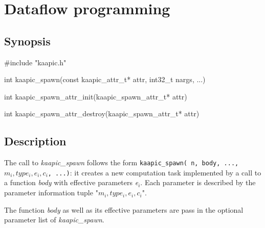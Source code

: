 \documentclass[a4paper, 11pt]{article}
\makeatletter
\newenvironment{apisection}[2][noshortnameprovided]{%
  \newpage
  \section{#2}
  \label{api@#1}
  \newcommand{\api@newpart}[4][noshortpartnameprovided]{%
    \newenvironment{##1}{%
      \subsection{##2}%
      \label{api@#1@##1}%
      ##3%
    }{##4}%
  }%
  \api@newpart[synopsis]{Synopsis}{}{}%
  \api@newpart[call]{Call}{}{}%
  \api@newpart[desc]{Description}{}{}%
  \api@newpart[params]{Parameters}{%
    \let\api@indesc\@empty
    \newcommand{\param}[1]{%
      \def\api@indesc{yes}%
      \begin{description}%
        \renewcommand{\param}[1]{\item[########1]}%
      \item[####1]
      }%
      \newenvironment{parameters}{%
        \begin{description}%
          \renewcommand{\param}[1]{\item[########1]}%
        }{%
        \end{description}%
      }
    }{%
      \ifx\api@indesc\@empty\relax\else%
    \end{description}%
    \fi%
  }%
  \api@newpart[ret]{Return value}{%
    \newcommand{\otherret}{\par\medskip\noindent}%
  }{}%
  \api@newpart[example]{Example}{}{}%
}{}
\newcommand{\fn}[1]{\textit{#1}}%
\newcommand{\kaapi}{\textsc{X-Kaapi}\xspace}
\makeatother
\begin{document}
\begin{apisection}[dataflow]{Dataflow programming}
  \begin{synopsis}
    \begin{code}
#include "kaapic.h"

int kaapic_spawn(const kaapic_attr_t* attr, int32_t nargs, ...)

int kaapic_spawn_attr_init(kaapic_spawn_attr_t* attr)

int kaapic_spawn_attr_destroy(kaapic_spawn_attr_t* attr)

    \end{code}
  \end{synopsis}
  \begin{desc}
    The call to \fn{kaapic\_spawn} follows the form \texttt{kaapic\_spawn( n, body, ..., $m_i,type_i, e_i, c_i$, ...)}: it
    creates a new computation task implemented by a call to a function
    \fn{body} with effective parameters \textit{e$_i$}. Each parameter is described by the parameter information tuple "$m_i,type_i, e_i, c_i$".

    The function \fn{body} as well as its effective parameters are pass in the optional parameter list of \fn{kaapic\_spawn}.
%
%    
  \end{desc}


\end{apisection}
\end{document}
